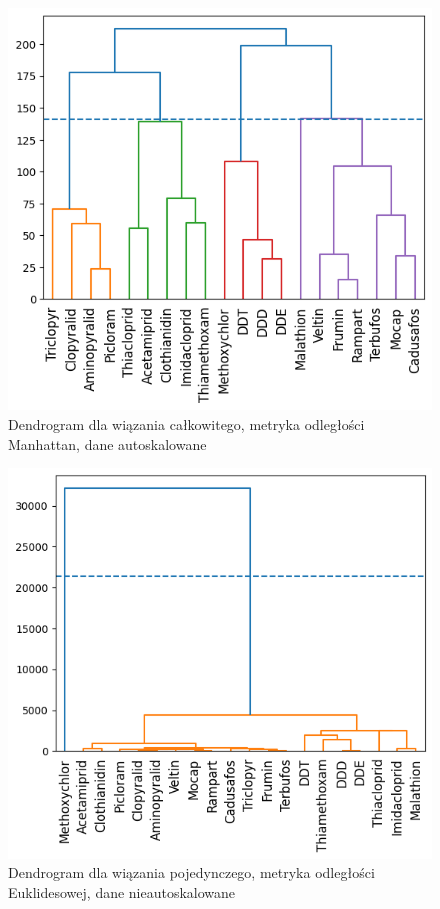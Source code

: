 \documentclass[12pt, a4paper]{article}
\begin{document}
    \begin{figure}[H]
        \centering
        \includegraphics{wc_Manh.png}
        \caption{Dendrogram dla wiązania całkowitego, metryka odległości Manhattan, dane autoskalowane}
    \end{figure}

    \begin{figure}[H]
        \centering
        \includegraphics{wp_Euk_b_as.png}
        \caption{Dendrogram dla wiązania pojedynczego, metryka odległości Euklidesowej, dane nieautoskalowane}
    \end{figure}
\end{document}
